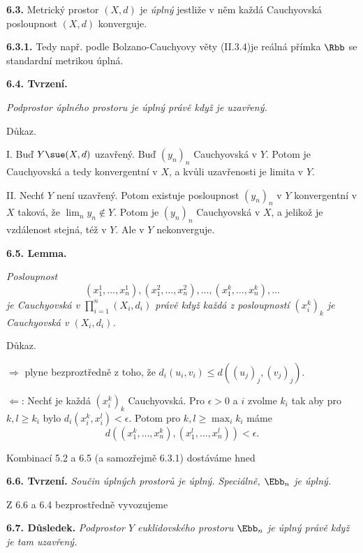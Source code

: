 \documentclass[12pt]{article}
\begin{document}
{ \bigskip
 
 {\bf 6.3.} Metrický prostor  $(X,d)$ je {\em úplný} jestliže v něm každá Cauchyovská posloupnost $(X,d)$ konverguje.
 
 \medskip
 
 {\bf 6.3.1.} Tedy např. podle Bolzano-Cauchyovy věty (II.3.4)je reálná přímka $\Rbb$ se standardní metrikou úplná.
 
 \bigskip
 
 {\bf 6.4. Tvrzení.} {\em Podprostor úplného prostoru je úplný právě když je uzavřený.
 
 Důkaz.} I. Buď $Y\sue(X,d)$ uzavřený. Buď $(y_n)_n$ Cauchyovská v $Y$. Potom je Cauchyovská a tedy konvergentní v  $X$, a kvůli uzavřenosti je limita v $Y$.
 
 II. Nechť $Y$ není uzavřený. Potom existuje posloupnost $(y_n)_n$ v $Y$ konvergentní v $X$ taková, že
 $\lim_ny_n\notin Y$. Potom je $(y_n)_n$ Cauchyovská v $X$, a jelikož je vzdálenost stejná, též v $Y$. Ale v $Y$ nekonverguje. \sq
 
 

\bigskip

 {\bf 6.5. Lemma.} {\em Posloupnost
 $$
 (x_1^1,\dots,x_n^1),(x_1^2,\dots,x_n^2),\dots,(x_1^k,\dots,x_n^k),\dots
 $$
 je Cauchyovská v $\prod_{i=1}^n(X_i,d_i)$ právě když každá z posloupností $(x_i^k)_k$ je Cauchyovská v $(X_i,d_i)$.

 Důkaz. } $\Rightarrow$ plyne bezproztředně z toho, že $d_i(u_i,v_i)\leq d((u_j)_j,(v_j)_j)$.
 
 \smallskip
 
 $\Leftarrow$: Nechť je každá $(x_i^k)_k$ Cauchyovská. Pro $\epsilon>0$ a $i$ zvolme 
 $k_i$ tak aby pro $k,l\geq k_i$ bylo $d_i(x_i^k,x_i^l)<\epsilon$. Potom pro $k,l\geq\max_ik_i$ máme
 $$
 d((x_1^k,\dots,x_n^k),(x_1^l,\dots,x_n^l))<\epsilon.
 $$\sq
 
 \bigskip
 
 Kombinací 5.2 a 6.5 (a samozřejmě 6.3.1) dostáváme hned
 
 \medskip
 
 {\bf 6.6. Tvrzení.} {\em Součin úplných prostorů je úplný. Speciálně, $\Ebb_n$ je úplný.}
 
 
 \bigskip
 
 Z 6.6 a  6.4 bezprostředně vyvozujeme
 
 \medskip
 
 {\bf 6.7. Důsledek.} {\em Podprostor $Y$ euklidovského prostoru $\Ebb_n$ je úplný právě když je tam uzavřený.}
 
}
\end{document}
